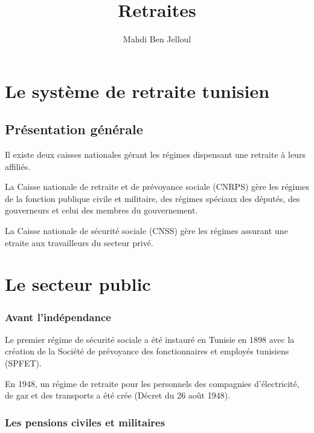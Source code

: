 \documentclass[
  letterpaper,
  DIV=11,
  numbers=noendperiod]{scrreprt}
\title{Retraites}
\author{Mahdi Ben Jelloul}
\date{}
\renewcommand*\contentsname{Table of contents}
\newcommand\contentsname{Table of contents}
\begin{document}
\maketitle

\renewcommand*\contentsname{Table of contents}
{
\hypersetup{linkcolor=}
\setcounter{tocdepth}{2}
\tableofcontents
}


\chapter{Le système de retraite
tunisien}\label{le-systuxe8me-de-retraite-tunisien}

\section{Présentation générale}\label{pruxe9sentation-guxe9nuxe9rale}

Il existe deux caisses nationales gérant les régimes dispensant une
retraite à leurs affiliés.

La Caisse nationale de retraite et de prévoyance sociale (CNRPS) gère
les régimes de la fonction publique civile et militaire, des régimes
spéciaux des députés, des gouverneurs et celui des membres du
gouvernement.

La Caisse nationale de sécurité sociale (CNSS) gère les régimes assurant
une etraite aux travailleurs du secteur privé.


\chapter{Le secteur public}\label{le-secteur-public}

\subsection{Avant l'indépendance}\label{avant-linduxe9pendance}

Le premier régime de sécurité sociale a été instauré en Tunisie en 1898
avec la création de la Société de prévoyance des fonctionnaires et
employés tunisiens (SPFET).

En 1948, un régime de retraite pour les personnels des compagnies
d'électricité, de gaz et des transports a été crée (Décret du 26 août
1948).

\subsection{Les pensions civiles et
militaires}\label{les-pensions-civiles-et-militaires}
\end{document}
